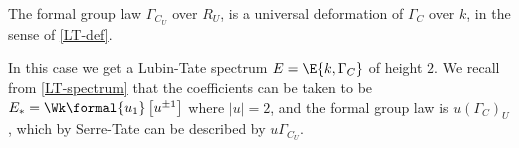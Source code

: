 \begin{theorem}[``$\Gamma_{C_U} = \left({\Gamma_C}\right)_U$"]
	The formal group law $\Gamma_{C_U}$ over $R_U$, is a universal deformation of $\Gamma_C$ over $k$, in the sense of \ref{LT-def}.
\end{theorem}

In this case we get a Lubin-Tate spectrum $E = \E{k, \Gamma_C}$ of height $2$.
We recall from \ref{LT-spectrum} that the coefficients can be taken to be $E_* = \Wk\formal{u_1}\left[u^{\pm 1}\right]$ where $\left|u\right| = 2$, and the formal group law is $u\left(\Gamma_C\right)_U$, which by Serre-Tate can be described by $u \Gamma_{C_U}$.
